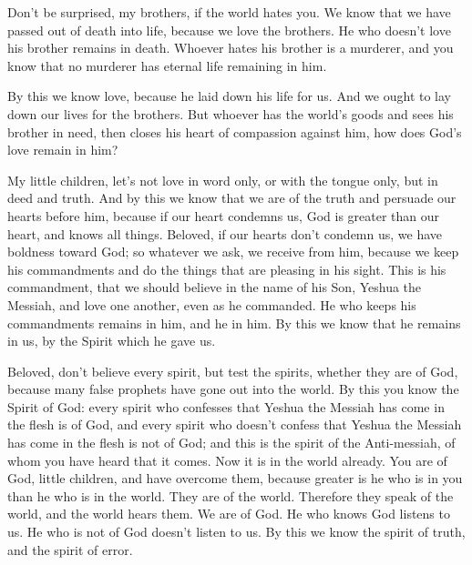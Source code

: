 \myverse{}Don’t be surprised, my brothers, if the world hates you. \myverse{}We know that we have passed out of death into life, because we love the brothers.
He who doesn’t love his brother remains in death. \myverse{}Whoever hates his brother is a murderer, and you know that no murderer has eternal life remaining in him.


\myverse{}By this we know love, because he laid down his life for us. And we ought to lay down our lives for the brothers. \myverse{}But whoever has the world’s goods and sees his brother in need, then closes his heart of compassion against him, how does God’s love remain in him?


\myverse{}My little children, let’s not love in word only, or with the tongue only, but in deed and truth. \myverse{}And by this we know that we are of the truth and persuade our hearts before him, \myverse{}because if our heart condemns us, God is greater than our heart, and knows all things. \myverse{}Beloved, if our hearts don’t condemn us, we have boldness toward God; \myverse{}so whatever we ask, we receive from him, because we keep his commandments and do the things that are pleasing in his sight. \myverse{}This is his commandment, that we should believe in the name of his Son, Yeshua the Messiah, and love one another, even as he commanded. \myverse{}He who keeps his commandments remains in him, and he in him. By this we know that he remains in us, by the Spirit which he gave us.


\mychapter{} \myverse*{}Beloved, don’t believe every spirit, but test the spirits, whether they are of God, because many false prophets have gone out into the world. \myverse{}By this you know the Spirit of God: every spirit who confesses that Yeshua the Messiah has come in the flesh is of God, \myverse{}and every spirit who doesn’t confess that Yeshua the Messiah has come in the flesh is not of God; and this is the spirit of the Anti-messiah, of whom you have heard that it comes. Now it is in the world already. \myverse{}You are of God, little children, and have overcome them, because greater is he who is in you than he who is in the world. \myverse{}They are of the world. Therefore they speak of the world, and the world hears them. \myverse{}We are of God. He who knows God listens to us. He who is not of God doesn’t listen to us. By this we know the spirit of truth, and the spirit of error.


